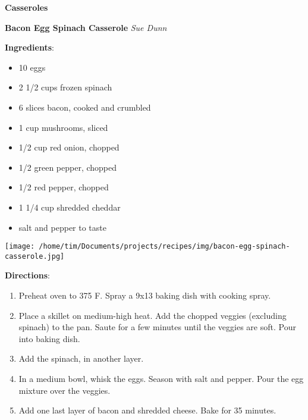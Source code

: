 \documentclass[11pt, twoside, openany]{book}
\begin{document}
{\newpage \LARGE \textbf{Casseroles}} \label{casseroles}\vspace{4mm}\\
\noindent\begin{minipage}[t]{\linewidth}%
{\Large\textbf{Bacon Egg Spinach Casserole}} \label{bacon-egg-spinach-casserole}\hfill\textit{Sue Dunn}\\
\noindent\begin{minipage}[t]{0.78\linewidth}%
\textbf{Ingredients}:\vspace{-3mm}
\begin{multicols}{2}
\begin{itemize}\setlength\itemsep{-1mm}
\item 10 eggs
\item 2 1/2 cups frozen spinach
\item 6 slices bacon, cooked and crumbled
\item 1 cup mushrooms, sliced
\item 1/2 cup red onion, chopped
\item 1/2 green pepper, chopped
\item 1/2 red pepper, chopped
\item 1 1/4 cup shredded cheddar
\item salt and pepper to taste
\end{itemize}
\end{multicols}
\end{minipage}
\noindent\begin{minipage}[t]{0.18\linewidth}
\centering \strut\vspace*{-\baselineskip}\newline
\texttt{[image: /home/tim/Documents/projects/recipes/img/bacon-egg-spinach-casserole.jpg]}\\
\end{minipage}\vspace{3mm}
\textbf{Directions}:
\vspace{-3mm}\begin{enumerate}\setlength\itemsep{-1mm}
\item Preheat oven to 375 F. Spray a 9x13 baking dish with cooking spray.
\item Place a skillet on medium-high heat. Add the chopped veggies (excluding spinach) to the pan. Saute for a few minutes until the veggies are soft. Pour into baking dish.
\item Add the spinach, in another layer. 
\item In a medium bowl, whisk the eggs. Season with salt and pepper. Pour the egg mixture over the veggies.
\item Add one last layer of bacon and shredded cheese. Bake for 35 minutes.
\end{enumerate}
\end{minipage}\vspace{8mm}
\end{document}
